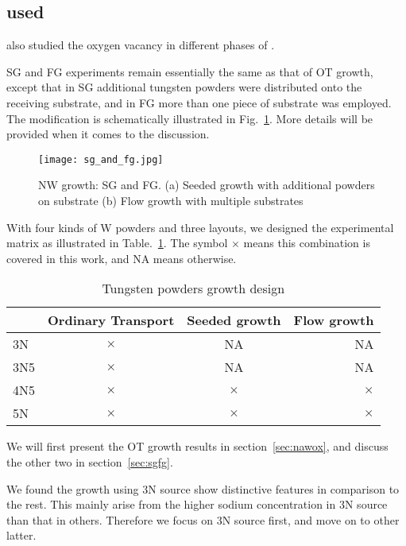 \subsection{used}

\citeauthor{Chatten2005} also studied the oxygen vacancy in different phases of .\cite{Chatten2005}

SG and FG experiments remain essentially the same as that of OT growth, except that in SG additional tungsten powders were distributed onto the receiving substrate, and in FG more than one piece of substrate was employed. The modification is schematically illustrated in Fig.~\ref{fig:wogrowsf}. More details will be provided when it comes to the discussion.
\begin{figure}[htb]
\centering
\texttt{[image: sg\_and\_fg.jpg]}
\caption[ NW growth: SG and FG]{ NW growth: SG and FG. (a) Seeded growth with additional powders on substrate (b) Flow growth with multiple substrates}
\label{fig:wogrowsf}
\end{figure}

With four kinds of W powders and three layouts, we designed the experimental matrix as illustrated in Table.~\ref{tab:matrix}. The symbol $\times$ means this combination is covered in this work, and NA means otherwise.
\begin{table}[htb]
\centering
\caption{Tungsten powders growth design}\label{tab:matrix}
\begin{tabular}{lccr}
\toprule
 & Ordinary Transport & Seeded growth & Flow growth \\
\midrule
3N   &  $\times$ & NA &  NA   \\
3N5  &  $\times$ & NA &  NA   \\
4N5  &  $\times$ & $\times$ & $\times$ \\
5N   &  $\times$ & $\times$ &  $\times$ \\
\bottomrule
\end{tabular}
\end{table}

We will first present the OT growth results in section~\ref{sec:nawox}, and discuss the other two in section~\ref{sec:sgfg}.

We found the growth using 3N source show distinctive features in comparison to the rest. This mainly arise from the higher sodium concentration in 3N source than that in others. Therefore we focus on 3N source first, and move on to other latter.


